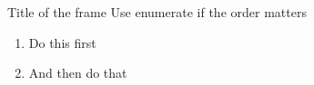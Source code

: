 \begin{frame}{Title of the frame}
  Use enumerate if the order matters
  
  \begin{enumerate}
  \item Do this first
  \item And then do that
  \end{enumerate}
\end{frame}


